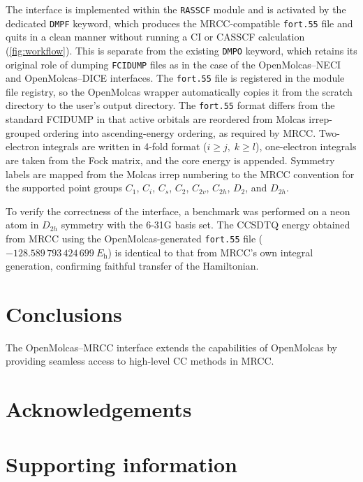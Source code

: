 \documentclass[journal=jctcce,a4paper]{achemso}
\begin{document}
The interface is implemented within the \texttt{RASSCF} module and is activated by the dedicated \texttt{DMPF} 
keyword, which produces the MRCC-compatible \texttt{fort.55} file and quits in a clean manner without running a 
CI or CASSCF calculation (\cref{fig:workflow}). This is separate from the existing \texttt{DMPO} keyword, which 
retains its original role of dumping \texttt{FCIDUMP} files as in the case of the OpenMolcas--NECI and 
OpenMolcas--DICE interfaces.\cite{LiManni2023} The \texttt{fort.55} file is registered 
in the module file registry, so the OpenMolcas wrapper automatically copies it from the scratch directory to the 
user's output directory.
The \texttt{fort.55} format differs from the standard FCIDUMP in that active orbitals are reordered from Molcas 
irrep-grouped ordering into ascending-energy ordering, as required by MRCC. Two-electron integrals are written 
in 4-fold format ($i \ge j,\; k \ge l$), one-electron integrals are taken from the Fock matrix, and the core 
energy is appended. Symmetry labels are mapped from the Molcas irrep numbering to the MRCC convention for the 
supported point groups $C_1$, $C_i$, $C_s$, $C_2$, $C_{2v}$, $C_{2h}$, $D_2$, and $D_{2h}$.

To verify the correctness of the interface, a benchmark was performed on a neon atom in $D_{2h}$ symmetry with the 
6-31G basis set. The CCSDTQ energy obtained from MRCC using the OpenMolcas-generated \texttt{fort.55} file 
($-128.589\,793\,424\,699~E_\mathrm{h}$) is identical to that from MRCC's own integral generation, confirming 
faithful transfer of the Hamiltonian.

\section*{Conclusions}

The OpenMolcas--MRCC interface extends the capabilities of OpenMolcas by providing seamless access to high-level 
CC methods in MRCC.

\section*{Acknowledgements}


\section*{Supporting information}
\end{document}
